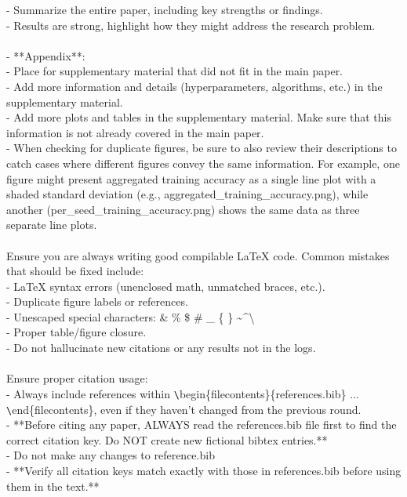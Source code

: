\begin{tcolorbox}[colback=gray!10, colframe=gray!40!black, breakable=true, title=CLAUDE.md for the writing agent]
  - Summarize the entire paper, including key strengths or findings.\\
  - Results are strong, highlight how they might address the research problem.\\
\\
- **Appendix**:\\
  - Place for supplementary material that did not fit in the main paper.\\
  - Add more information and details (hyperparameters, algorithms, etc.) in the supplementary material.\\
  - Add more plots and tables in the supplementary material. Make sure that this information is not already covered in the main paper.\\
  - When checking for duplicate figures, be sure to also review their descriptions to catch cases where different figures convey the same information. For example, one figure might present aggregated training accuracy as a single line plot with a shaded standard deviation (e.g., aggregated\_training\_accuracy.png), while another (per\_seed\_training\_accuracy.png) shows the same data as three separate line plots.\\
\\
Ensure you are always writing good compilable LaTeX code. Common mistakes that should be fixed include:\\
- LaTeX syntax errors (unenclosed math, unmatched braces, etc.).\\
- Duplicate figure labels or references.\\
- Unescaped special characters: \& \% \$ \# \_ \{ \} \textasciitilde \textasciicircum \textbackslash \\
- Proper table/figure closure.\\
- Do not hallucinate new citations or any results not in the logs.\\
\\
Ensure proper citation usage:\\
- Always include references within \verb|\|begin\{filecontents\}\{references.bib\} ... \verb|\|end\{filecontents\}, even if they haven't changed from the previous round.\\
- **Before citing any paper, ALWAYS read the references.bib file first to find the correct citation key. Do NOT create new fictional bibtex entries.**\\
- Do not make any changes to reference.bib\\
- **Verify all citation keys match exactly with those in references.bib before using them in the text.**\\

\end{tcolorbox}
